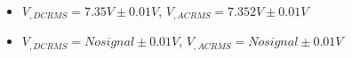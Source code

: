 \begin{itemize}
     \item $V_{, DCRMS}=7.35V\pm 0.01\unit{V}$, $V_{, ACRMS}=7.352V\pm 0.01\unit{V}$ 
     \item $V_{, DCRMS}=No signal\pm 0.01\unit{V}$, $V_{, ACRMS}=No signal\pm 0.01\unit{V}$\\
\end{itemize}